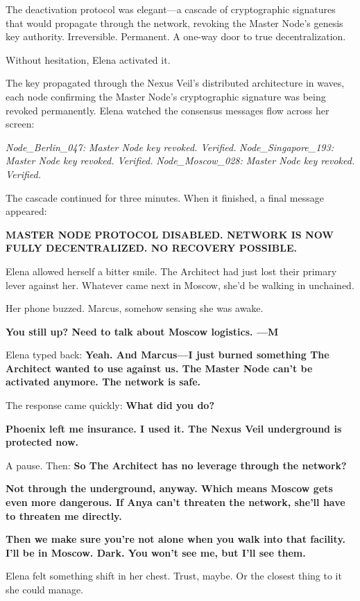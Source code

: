 The deactivation protocol was elegant---a cascade of cryptographic signatures that would propagate through the network, revoking the Master Node's genesis key authority. Irreversible. Permanent. A one-way door to true decentralization.

Without hesitation, Elena activated it.

The key propagated through the Nexus Veil's distributed architecture in waves, each node confirming the Master Node's cryptographic signature was being revoked permanently. Elena watched the consensus messages flow across her screen:

\emph{Node\_Berlin\_047: Master Node key revoked. Verified.} \emph{Node\_Singapore\_193: Master Node key revoked. Verified.} \emph{Node\_Moscow\_028: Master Node key revoked. Verified.}

The cascade continued for three minutes. When it finished, a final message appeared:

\textbf{MASTER NODE PROTOCOL DISABLED. NETWORK IS NOW FULLY DECENTRALIZED. NO RECOVERY POSSIBLE.}

Elena allowed herself a bitter smile. The Architect had just lost their primary lever against her. Whatever came next in Moscow, she'd be walking in unchained.

Her phone buzzed. Marcus, somehow sensing she was awake.

\textbf{You still up? Need to talk about Moscow logistics. ---M}

Elena typed back: \textbf{Yeah. And Marcus---I just burned something The Architect wanted to use against us. The Master Node can't be activated anymore. The network is safe.}

The response came quickly: \textbf{What did you do?}

\textbf{Phoenix left me insurance. I used it. The Nexus Veil underground is protected now.}

A pause. Then: \textbf{So The Architect has no leverage through the network?}

\textbf{Not through the underground, anyway. Which means Moscow gets even more dangerous. If Anya can't threaten the network, she'll have to threaten me directly.}

\textbf{Then we make sure you're not alone when you walk into that facility. I'll be in Moscow. Dark. You won't see me, but I'll see them.}

Elena felt something shift in her chest. Trust, maybe. Or the closest thing to it she could manage.

